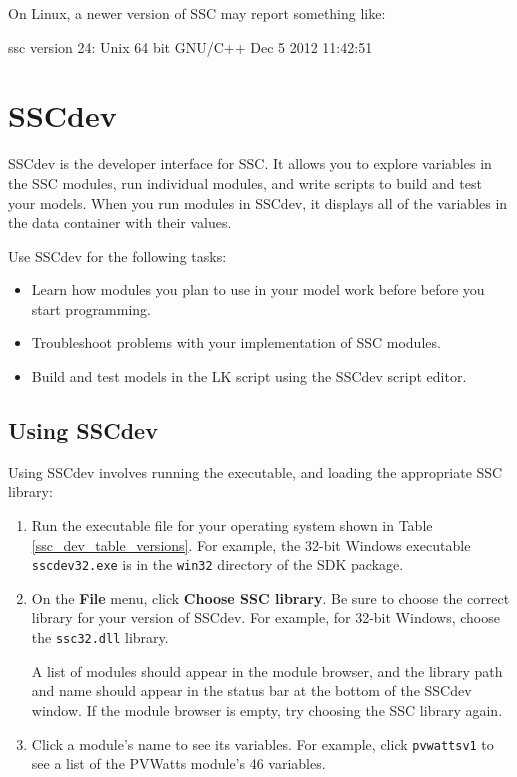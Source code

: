 \documentclass{article}
\begin{document}
On Linux, a newer version of SSC may report something like:
\begin{verbatimtab}[4]
	ssc version 24: Unix 64 bit GNU/C++ Dec  5 2012 11:42:51
\end{verbatimtab}

\section{SSCdev}
\label{sec_sscdev}

SSCdev is the developer interface for SSC. It allows you to explore variables in the SSC modules, run individual modules, and write scripts to build and test your models. When you run modules in SSCdev, it displays all of the variables in the data container with their values.

Use SSCdev for the following tasks:

\begin{itemize}
\item Learn how modules you plan to use in your model work before before you start programming.
\item Troubleshoot problems with your implementation of SSC modules.
\item Build and test models in the LK script using the SSCdev script editor.
\end{itemize}

\subsection{Using SSCdev}
\label{sec_sscdev_get_started}

Using SSCdev involves running the executable, and loading the appropriate SSC library:

\begin{enumerate}
\item Run the executable file for your operating system shown in Table \ref{ssc_dev_table_versions}. For example, the 32-bit Windows executable \texttt{sscdev32.exe} is in the \texttt{win32} directory of the SDK package.
\item On the \textbf{File} menu, click \textbf{Choose SSC library}. Be sure to choose the correct library for your version of SSCdev. For example, for 32-bit Windows, choose the \texttt{ssc32.dll} library.

A list of modules should appear in the module browser, and the library path and name should appear in the status bar at the bottom of the SSCdev window. If the module browser is empty, try choosing the SSC library again.
\item Click a module's name to see its variables. For example, click \texttt{pvwattsv1} to see a list of the PVWatts module's 46 variables.
\end{enumerate}
\end{document}
